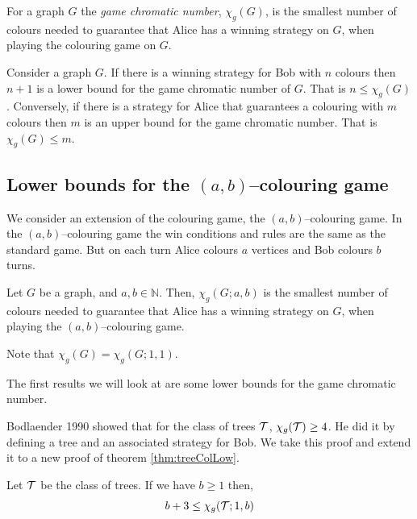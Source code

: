 
\begin{definition}
    For a graph $G$ the \textit{game chromatic number}, $\chi_g(G)$, is the smallest number of colours needed to guarantee that Alice has a winning strategy on $G$, when playing the colouring game on $G$.     
\end{definition}

Consider a graph $G$. If there is a winning strategy for Bob with $n$ colours then $n+1$ is a lower bound for the game chromatic number of $G$. That is $n\leq\chi_g(G)$. Conversely, if there is a strategy for Alice that guarantees a colouring with $m$ colours then $m$ is an upper bound for the game chromatic number. That is $\chi_g(G)\leq m$. 

\subsection{Lower bounds for the $(a,b)$--colouring game}

We consider an extension of the colouring game, the $(a,b)$--colouring game. In the $(a,b)$--colouring game the win conditions and rules are the same as the standard game. But on each turn Alice colours $a$ vertices and Bob colours $b$ turns.
\begin{definition}
    Let $G$ be a graph, and $a,b\in\mathbb{N}$. 
    Then, $\chi_g(G;a,b)$ is the smallest number of colours needed to guarantee that Alice has a winning strategy on $G$, when playing the $(a,b)$--colouring game. 
\end{definition}
Note that $\chi_g(G) = \chi_g(G;1,1)$.

The first results we will look at are some lower bounds for the game chromatic number.

Bodlaender 1990 \cite{bodlander1990} showed that for the class of trees $\mathcal{T}$,  $\chi_g(\mathcal{T}) \geq 4$. He did it by defining a tree and an associated strategy for Bob. We take this proof and extend it to a new proof of theorem \ref{thm:treeColLow}. 

\begin{theorem}\label{thm:treeColLow} %
    Let $\mathcal{T}$ be the class of trees. If we have $b \geq 1$  then,
    \[b+3 \leq \chi_g(\mathcal{T};1,b)\]
\end{theorem}

